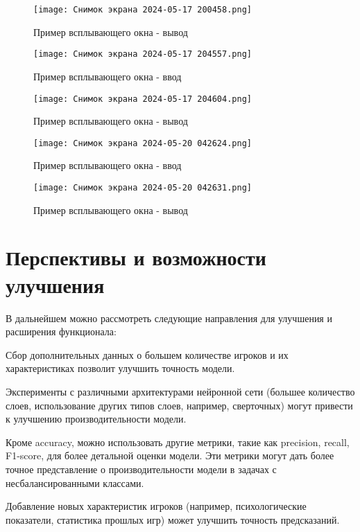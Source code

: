 \documentclass[12pt,a4paper]{article}
\begin{document}
\begin{figure}[!h]
\centering
\texttt{[image: Снимок экрана 2024-05-17 200458.png]}
\caption{Пример всплывающего окна - вывод}
\label{fig:example}
\end{figure}


\newpage
\begin{figure}[!h]
\centering
\texttt{[image: Снимок экрана 2024-05-17 204557.png]}
\caption{Пример всплывающего окна - ввод}
\label{fig:example}
\end{figure}

\begin{figure}[!h]
\centering
\texttt{[image: Снимок экрана 2024-05-17 204604.png]}
\caption{Пример всплывающего окна - вывод}
\label{fig:example}
\end{figure}
\newpage
\begin{figure}[!h]
\centering
\texttt{[image: Снимок экрана 2024-05-20 042624.png]}
\caption{Пример всплывающего окна - ввод}
\label{fig:example}
\end{figure}

\begin{figure}[!h]
\centering
\texttt{[image: Снимок экрана 2024-05-20 042631.png]}
\caption{Пример всплывающего окна - вывод}
\label{fig:example}
\end{figure}
\newpage

\section{Перспективы и возможности улучшения}
В дальнейшем можно рассмотреть следующие направления для улучшения и расширения функционала:

Сбор дополнительных данных о большем количестве игроков и их характеристиках позволит улучшить точность модели. 

Эксперименты с различными архитектурами нейронной сети (большее количество слоев, использование других типов слоев, например, сверточных) могут привести к улучшению производительности модели.

Кроме accuracy, можно использовать другие метрики, такие как precision, recall, F1-score, для более детальной оценки модели. Эти метрики могут дать более точное представление о производительности модели в задачах с несбалансированными классами.

Добавление новых характеристик игроков (например, психологические показатели, статистика прошлых игр) может улучшить точность предсказаний. 
\end{document}
